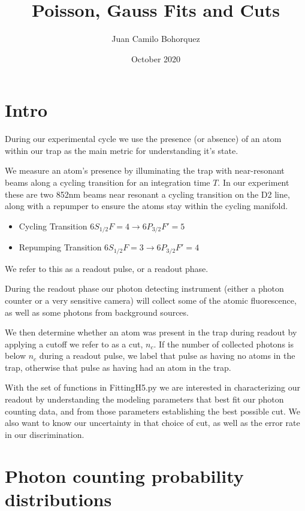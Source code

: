 \documentclass{article}
\title{Poisson, Gauss Fits and Cuts}
\author{Juan Camilo Bohorquez }
\date{October 2020}
\begin{document}
\maketitle

\section{Intro}

During our experimental cycle we use the presence (or absence) of an atom within our trap as the main metric for understanding it's state.

We measure an atom's presence by illuminating the trap with near-resonant beams along a cycling transition for an integration time $T$. In our experiment these are two 852nm beams near resonant a cycling transition on the D2 line, along with a repumper to ensure the atoms stay within the cycling manifold.
\begin{itemize}
    \item Cycling Transition $6S_{1/2}F=4 \rightarrow 6P_{3/2}F'=5$
    \item Repumping Transition $6S_{1/2}F=3 \rightarrow 6P_{3/2}F'=4$
\end{itemize}

We refer to this as a readout pulse, or a readout phase.

During the readout phase our photon detecting instrument (either a photon counter or a very sensitive camera) will collect some of the atomic fluorescence, as well as some photons from background sources. 

We then determine whether an atom was present in the trap during readout by applying a cutoff we refer to as a cut, $n_c$. If the number of collected photons is below $n_c$ during a readout pulse, we label that pulse as having no atoms in the trap, otherwise that pulse as having had an atom in the trap.

With the set of functions in FittingH5.py we are interested in characterizing our readout by understanding the modeling parameters that best fit our photon counting data, and from those parameters establishing the best possible cut. We also want to know our uncertainty in that choice of cut, as well as the error rate in our discrimination.

\section{Photon counting probability distributions}
\end{document}
